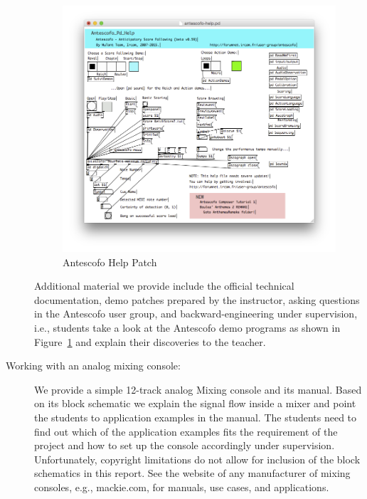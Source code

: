 \documentclass[onecolumn,nocopyrightspace,preprint]{sigplanconf}
\begin{document}
\begin{description}
\begin{figure}[ht]
    \centering
    \includegraphics[scale=0.5]{fig/ascohelp.png}
    \caption{Antescofo Help Patch}
    \label{fig:ascohelp}
\end{figure}

Additional material we provide include the official technical documentation,
demo patches prepared by the instructor, asking questions in the Antescofo
user group, and backward-engineering under supervision, i.e., students take a
look at the Antescofo demo programs as shown in Figure~\ref{fig:ascohelp} and
explain their discoveries to the teacher.

\item[Working with an analog mixing console:] We provide a simple 12-track
analog Mixing console and its manual. Based on its block schematic we
explain the signal flow inside a mixer and point the students to application
examples in the manual. The students need to find out which of the application
examples fits the requirement of the project and how to set up the console
accordingly under supervision. Unfortunately, copyright limitations do not
allow for inclusion of the block schematics in this report. See the website of
any manufacturer of mixing consoles, e.g., mackie.com, for manuals, use cases,
and applications.


\end{description}
\end{document}
